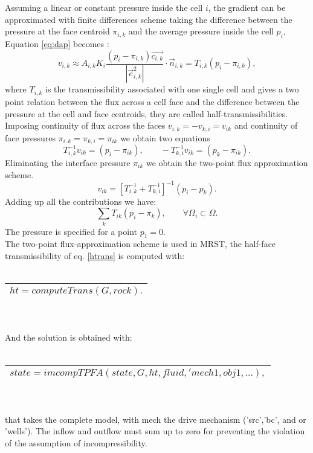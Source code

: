 \documentclass[a4paper,10pt]{report}
\begin{document}
Assuming a linear or constant pressure inside the cell $i$, the gradient can be approximated with finite differences scheme taking the difference between the pressure at the face centroid $\pi_{i,k}$ and the average pressure inside the cell $p_i$, Equation \eqref{eq:dap} becomes : 
\begin{equation}\label{eq:dap1}
 v_{i,k}\approx A_{i,k}K_i\frac{(p_i-\pi_{i,k})\vec{c_{i,k}}}{|\vec{c}_{i,k}^2|}\cdot \vec{n}_{i,k}=T_{i,k}(p_i-\pi_{i,k}),     
\end{equation}
where $T_{i,k}$ is the transmissibility associated with one single cell and gives a two point relation between the flux across a cell face and the difference between the pressure at the cell and face centroids, they are called half-transmissibilities. 
Imposing continuity of flux across the faces $v_{i,k}=-v_{k,i}=v_{ik}$ and continuity of face pressures $\pi_{i,k}=\pi_{k,i}=\pi_{ik}$ we obtain two equations 
\begin{equation}\label{eq:dap1}
 T_{i,k}^{-1}v_{ik}=(p_i-\pi_{ik}),     \qquad -T_{k,i}^{-1}v_{ik}=(p_k-\pi_{ik}).
\end{equation}
Eliminating the interface pressure $\pi_{ik}$ we obtain the two-point flux approximation scheme. 
\begin{equation}\label{eq:dap1}
v_{ik}=[ T_{i,k}^{-1}+T_{k,i}^{-1}]^{-1}(p_i-p_k).
\end{equation}
Adding up all the contributions we have:
\begin{equation}\label{eq:dap1}
 \sum_k T_{ik}(p_i-\pi_{k}),     \qquad \forall \Omega_i \subset \Omega.
\end{equation}
The pressure is specified for a point $p_1=0$.\\

The two-point flux-approximation scheme is used in MRST, the half-face transmissibility of
eq. \eqref{htrans} is computed with:\\\\
\begin{tabular}{|l|}
\hline
 $ht=computeTrans(G,rock).$\\
\hline
\end{tabular}
\\\\And the solution is obtained with:
\\\\
\begin{tabular}{|l|}
\hline
 $state=imcompTPFA(state,G,ht,fluid,'mech1,obj1,...),$\\
\hline
\end{tabular}
\\\\that takes the complete model, with mech the drive mechanism ('src','bc', and or 'wells').
The inflow and outflow must sum up to zero for preventing the violation of the assumption of incompressibility.
\end{document}
